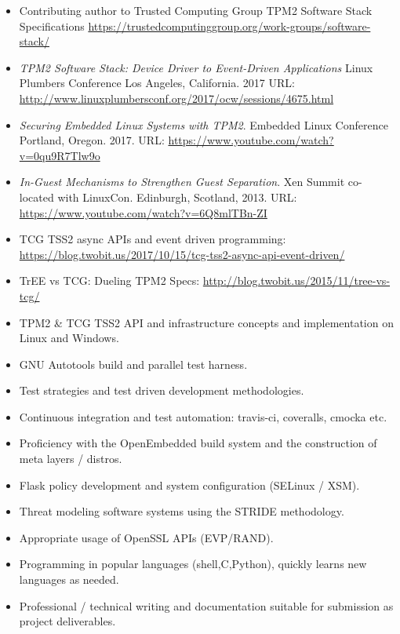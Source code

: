 \documentclass[letterpaper,11pt]{article}
\begin{document}
\begin {itemize}
  \setlength {\itemsep}{1pt}
  \setlength {\parskip}{0pt}
  \setlength {\parsep}{0pt}
  \item Contributing author to Trusted Computing Group TPM2 Software Stack Specifications
    \url {https://trustedcomputinggroup.org/work-groups/software-stack/}
  \item {\it TPM2 Software Stack: Device Driver to Event-Driven Applications}
    Linux Plumbers Conference
    Los Angeles, California.
    2017
    URL: \url {http://www.linuxplumbersconf.org/2017/ocw/sessions/4675.html}
  \item {\it Securing Embedded Linux Systems with TPM2}.
    Embedded Linux Conference
    Portland, Oregon.
    2017.
    URL: \url {https://www.youtube.com/watch?v=0qu9R7Tlw9o}
  \item {\it In-Guest Mechanisms to Strengthen Guest Separation}.
    Xen Summit co-located with LinuxCon.
    Edinburgh, Scotland,
    2013.
    URL: \url {https://www.youtube.com/watch?v=6Q8mlTBn-ZI}
  \item TCG TSS2 async APIs and event driven programming:
    \url {https://blog.twobit.us/2017/10/15/tcg-tss2-async-api-event-driven/}
  \item TrEE vs TCG: Dueling TPM2 Specs:
    \url {http://blog.twobit.us/2015/11/tree-vs-tcg/}
\end{itemize}

\begin {itemize}
  \setlength {\itemsep}{1pt}
  \setlength {\parskip}{0pt}
  \setlength {\parsep}{0pt}
  \item TPM2 \& TCG TSS2 API and infrastructure concepts and implementation
    on Linux and Windows.
  \item GNU Autotools build and parallel test harness.
  \item Test strategies and test driven development methodologies.
  \item Continuous integration and test automation: travis-ci, coveralls,
    cmocka etc.
  \item Proficiency with the OpenEmbedded build system and the construction of meta layers / distros.
  \item Flask policy development and system configuration (SELinux / XSM).
  \item Threat modeling software systems using the STRIDE methodology.
  \item Appropriate usage of OpenSSL APIs (EVP/RAND).
  \item Programming in popular languages (shell,C,Python), quickly learns new languages as needed.
  \item Professional / technical writing and documentation suitable for submission as project deliverables.
\end {itemize}
\end{document}
